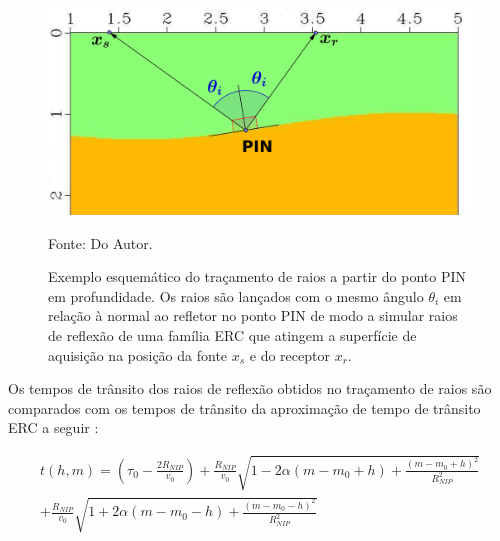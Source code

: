 \begin{figure}[H]
\caption{Exemplo esquemático do traçamento de raios a partir do ponto PIN em profundidade.
Os raios são lançados com o mesmo ângulo $\theta_i$ em relação à normal ao refletor no ponto
PIN de modo a simular raios de reflexão de uma família ERC que atingem a superfície de aquisição
na posição da fonte $x_s$ e do receptor $x_r$.}
\begin{center}
\includegraphics[scale=0.5]{images/modelagem2.png}
\vspace{-0.3cm}
\end{center}
\begin{center}
 Fonte: Do Autor.
\end{center}
\label{fig:9.5}
\end{figure}

Os tempos de trânsito dos raios de reflexão obtidos no traçamento de raios são comparados com os tempos
de trânsito da aproximação de tempo de trânsito ERC a seguir \cite{cre}:

\begin{multline}
\label{eq:9.1}
t(h,m)= \left( \tau_0-\frac{2R_{NIP}}{v_0} \right) 
+\frac{R_{NIP}}{v_0}\sqrt{1-2\alpha(m-m_0+h)+\frac{(m-m_0+h)^2}{R_{NIP}^2}} \\
+\frac{R_{NIP}}{v_0}\sqrt{1+2\alpha(m-m_0-h)+\frac{(m-m_0-h)^2}{R_{NIP}^2}}
\end{multline}

